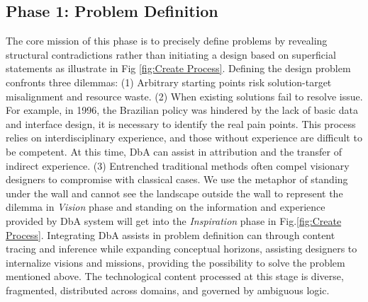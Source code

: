 \subsection{Phase 1: Problem Definition}
The core mission of this phase is to precisely define problems by revealing structural contradictions rather than initiating a design based on superficial statements\cite{simon2019sciences, hsueh2024counts} as illustrate in Fig \ref{fig:Create Process}. Defining the design problem confronts three dilemmas: (1) Arbitrary starting points risk solution-target misalignment and resource waste. (2) When existing solutions fail to resolve issue. For example, in 1996, the Brazilian policy was hindered by the lack of basic data and interface design\cite{barzelay2007learning}, it is necessary to identify the real pain points. This process relies on interdisciplinary experience, and those without experience are difficult to be competent. At this time, DbA can assist in attribution and the transfer of indirect experience. (3) Entrenched traditional methods often compel visionary designers to compromise with classical cases\cite{wills1994towards}. We use the metaphor of standing under the wall and cannot see the landscape outside the wall to represent the dilemma in \textit{Vision} phase and standing on the information and experience provided by DbA system will get into the \textit{Inspiration} phase in Fig.\ref{fig:Create Process}. Integrating DbA assists in problem definition can through content tracing and inference while expanding conceptual horizons\cite{hewstone1990ultimate}, assisting designers to internalize visions and missions, providing the possibility to solve the problem mentioned above. The technological content processed at this stage is diverse, fragmented, distributed across domains, and governed by ambiguous logic\cite{li2010agentsinternational}.


